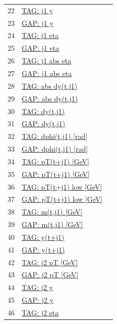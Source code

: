 \documentclass[11pt,a4paper]{article}
\begin{document}
\begin{longtable}{@{}rL{112mm}r@{}}
22 & \hyperref[atlas:p22]{TAG: j1 y} & \pageref{atlas:p22}\\
23 & \hyperref[atlas:p23]{GAP: j1 y} & \pageref{atlas:p23}\\
24 & \hyperref[atlas:p24]{TAG: j1 eta} & \pageref{atlas:p24}\\
25 & \hyperref[atlas:p25]{GAP: j1 eta} & \pageref{atlas:p25}\\
26 & \hyperref[atlas:p26]{TAG: j1 abs eta} & \pageref{atlas:p26}\\
27 & \hyperref[atlas:p27]{GAP: j1 abs eta} & \pageref{atlas:p27}\\
28 & \hyperref[atlas:p28]{TAG: abs dy(t,j1)} & \pageref{atlas:p28}\\
29 & \hyperref[atlas:p29]{GAP: abs dy(t,j1)} & \pageref{atlas:p29}\\
30 & \hyperref[atlas:p30]{TAG: dy(t,j1)} & \pageref{atlas:p30}\\
31 & \hyperref[atlas:p31]{GAP: dy(t,j1)} & \pageref{atlas:p31}\\
32 & \hyperref[atlas:p32]{TAG: dphi(t,j1) [rad]} & \pageref{atlas:p32}\\
33 & \hyperref[atlas:p33]{GAP: dphi(t,j1) [rad]} & \pageref{atlas:p33}\\
34 & \hyperref[atlas:p34]{TAG: pT(t+j1) [GeV]} & \pageref{atlas:p34}\\
35 & \hyperref[atlas:p35]{GAP: pT(t+j1) [GeV]} & \pageref{atlas:p35}\\
36 & \hyperref[atlas:p36]{TAG: pT(t+j1) low [GeV]} & \pageref{atlas:p36}\\
37 & \hyperref[atlas:p37]{GAP: pT(t+j1) low [GeV]} & \pageref{atlas:p37}\\
38 & \hyperref[atlas:p38]{TAG: m(t,j1) [GeV]} & \pageref{atlas:p38}\\
39 & \hyperref[atlas:p39]{GAP: m(t,j1) [GeV]} & \pageref{atlas:p39}\\
40 & \hyperref[atlas:p40]{TAG: y(t+j1)} & \pageref{atlas:p40}\\
41 & \hyperref[atlas:p41]{GAP: y(t+j1)} & \pageref{atlas:p41}\\
42 & \hyperref[atlas:p42]{TAG: j2 pT [GeV]} & \pageref{atlas:p42}\\
43 & \hyperref[atlas:p43]{GAP: j2 pT [GeV]} & \pageref{atlas:p43}\\
44 & \hyperref[atlas:p44]{TAG: j2 y} & \pageref{atlas:p44}\\
45 & \hyperref[atlas:p45]{GAP: j2 y} & \pageref{atlas:p45}\\
46 & \hyperref[atlas:p46]{TAG: j2 eta} & \pageref{atlas:p46}\\

\end{longtable}
\end{document}
